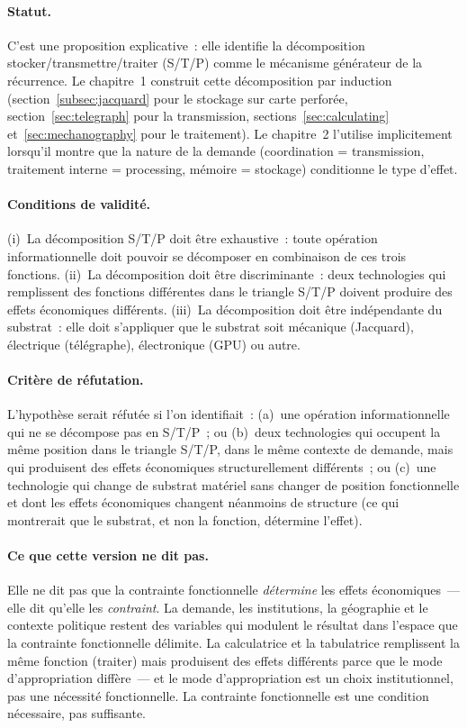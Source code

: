\paragraph{Statut.} C'est une proposition explicative~: elle identifie la décomposition stocker/transmettre/traiter (S/T/P) comme le mécanisme générateur de la récurrence. Le chapitre~1 construit cette décomposition par induction (section~\ref{subsec:jacquard} pour le stockage sur carte perforée, section~\ref{sec:telegraph} pour la transmission, sections~\ref{sec:calculating} et~\ref{sec:mechanography} pour le traitement). Le chapitre~2 l'utilise implicitement lorsqu'il montre que la nature de la demande (coordination = transmission, traitement interne = processing, mémoire = stockage) conditionne le type d'effet.

\paragraph{Conditions de validité.} (i)~La décomposition S/T/P doit être exhaustive~: toute opération informationnelle doit pouvoir se décomposer en combinaison de ces trois fonctions. (ii)~La décomposition doit être discriminante~: deux technologies qui remplissent des fonctions différentes dans le triangle S/T/P doivent produire des effets économiques différents. (iii)~La décomposition doit être indépendante du substrat~: elle doit s'appliquer que le substrat soit mécanique (Jacquard), électrique (télégraphe), électronique (GPU) ou autre.

\paragraph{Critère de réfutation.} L'hypothèse serait réfutée si l'on identifiait~: (a)~une opération informationnelle qui ne se décompose pas en S/T/P~; ou (b)~deux technologies qui occupent la même position dans le triangle S/T/P, dans le même contexte de demande, mais qui produisent des effets économiques structurellement différents~; ou (c)~une technologie qui change de substrat matériel sans changer de position fonctionnelle et dont les effets économiques changent néanmoins de structure (ce qui montrerait que le substrat, et non la fonction, détermine l'effet).

\paragraph{Ce que cette version ne dit pas.} Elle ne dit pas que la contrainte fonctionnelle \emph{détermine} les effets économiques~--- elle dit qu'elle les \emph{contraint}. La demande, les institutions, la géographie et le contexte politique restent des variables qui modulent le résultat dans l'espace que la contrainte fonctionnelle délimite. La calculatrice et la tabulatrice remplissent la même fonction (traiter) mais produisent des effets différents parce que le mode d'appropriation diffère~--- et le mode d'appropriation est un choix institutionnel, pas une nécessité fonctionnelle. La contrainte fonctionnelle est une condition nécessaire, pas suffisante.

